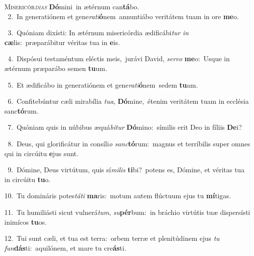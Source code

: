 \lettrine{\initial\textcolor{\initialcolor}{M}}{isericór\-\textit{di}\-\textit{as}} \textbf{Dó}\-mini~\star in ætérnum can\-\textbf{tá}\-bo.\\
{\numbfont\textcolor{\numbcolor}{~2.}}~In generatiónem et gene\-\textit{ra}\-\textit{ti}\textbf{ó}nem~\star annuntiábo veritátem tuam in ore \textbf{me}\-o.\par
{\numbfont\textcolor{\numbcolor}{~3.}}~Quóniam dixísti: In ætérnum misericórdia ædificábi\textit{tur} \textit{in} \textbf{cæ}\-lis:~\star præparábitur véritas tua in \textbf{e}\-is.\par
{\numbfont\textcolor{\numbcolor}{~4.}}~Dispósui testaméntum eléctis meis,~\dagger jurávi David, \textit{ser}\-\textit{vo} \textbf{me}\-o:~\star Usque in ætérnum præparábo semen \textbf{tu}\-um.\par
{\numbfont\textcolor{\numbcolor}{~5.}}~Et ædificábo in generatiónem et gene\-\textit{ra}\-\textit{ti}\textbf{ó}nem~\star sedem \textbf{tu}\-am.\par
{\numbfont\textcolor{\numbcolor}{~6.}}~Confitebúntur cæli mirabília \textit{tu}\-\textit{a}, \textbf{Dó}\-mine,~\star étenim veritátem tuam in ecclésia sanc\-\textbf{tó}\-rum.\par
{\numbfont\textcolor{\numbcolor}{~7.}}~Quóniam quis in núbibus æquá\-\textit{bi}\-\textit{tur} \textbf{Dó}\-mino:~\star símilis erit Deo in fíliis \textbf{De}\-i?\par
{\numbfont\textcolor{\numbcolor}{~8.}}~Deus, qui glorificátur in consíli\textit{o} \textit{sanc}\-\textbf{tó}rum:~\star magnus et terríbilis super omnes qui in circúitu \textbf{e}\-jus sunt.\par
{\numbfont\textcolor{\numbcolor}{~9.}}~Dómine, Deus virtútum, quis sí\-\textit{mi}\-\textit{lis} \textbf{ti}\-bi?~\star potens es, Dómine, et véritas tua in circúitu \textbf{tu}\-o.\par
{\numbfont\textcolor{\numbcolor}{10.}}~Tu domináris potes\-\textit{tá}\-\textit{ti} \textbf{ma}\-ris:~\star motum autem flúctuum ejus tu \textbf{mí}\-tigas.\par
{\numbfont\textcolor{\numbcolor}{11.}}~Tu humiliásti sicut vulnerá\-\textit{tum}\-, \textit{su}\-\textbf{pér}bum:~\star in bráchio virtútis tuæ dispersísti inimícos \textbf{tu}\-os.\par
{\numbfont\textcolor{\numbcolor}{12.}}~Tui sunt cæli, et tua est terra:~\dagger orbem terræ et plenitúdinem ejus \textit{tu} \textit{fun}\-\textbf{dás}ti:~\star aquilónem, et mare tu cre\-\textbf{ás}\-ti.\par
